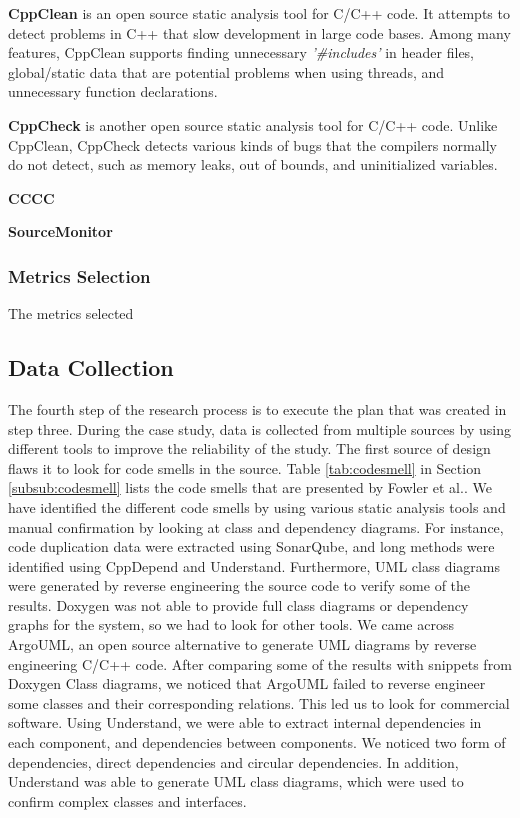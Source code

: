 \textbf{CppClean} is an open source static analysis tool for C/C++ code. It attempts to detect problems in C++ that slow development in large code bases. Among many features, CppClean supports finding unnecessary \textit{'\#includes'} in header files, global/static data that are potential problems when using threads, and unnecessary function declarations.

\textbf{CppCheck} is another open source static analysis tool for C/C++ code. Unlike CppClean, CppCheck detects various kinds of bugs that the compilers normally do not detect, such as memory leaks, out of bounds, and uninitialized variables.

\textbf{CCCC}

\textbf{SourceMonitor}

\subsubsection{Metrics Selection}
The metrics selected 




\subsection{Data Collection}
The fourth step of the research process is to execute the plan that was created in step three. During the case study, data is collected from multiple sources by using different tools to improve the reliability of the study. The first source of design flaws it to look for code smells in the source. Table \ref{tab:codesmell} in Section \ref{subsub:codesmell} lists the code smells that are presented by Fowler et al.\cite{fowler1999refactoring}. We have identified the different code smells by using various static analysis tools and manual confirmation by looking at class and dependency diagrams. For instance, code duplication data were extracted using SonarQube, and long methods were identified using CppDepend and Understand. Furthermore, UML class diagrams were generated by reverse engineering the source code to verify some of the results. Doxygen was not able to provide full class diagrams or dependency graphs for the system, so we had to look for other tools. We came across ArgoUML, an open source alternative to generate UML diagrams by reverse engineering C/C++ code. After comparing some of the results with snippets from Doxygen Class diagrams, we noticed that ArgoUML failed to reverse engineer some classes and their corresponding relations. This led us to look for commercial software. Using Understand, we were able to extract internal dependencies in each component, and dependencies between components. We noticed two form of dependencies, direct dependencies and circular dependencies. In addition, Understand was able to generate UML class diagrams, which were used to confirm complex classes and interfaces. 






